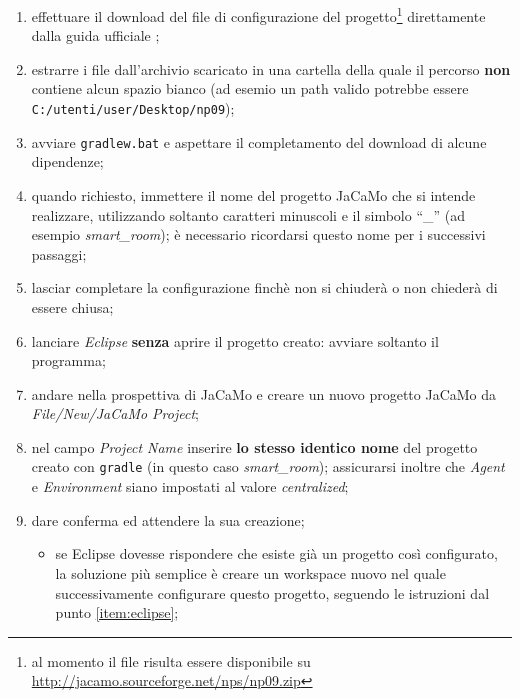 \documentclass[12pt,a4paper,openright,oneside]{report}
\newcommand{\quotes}[1]{``#1''}
\begin{document}
\begin{enumerate}
	\item effettuare il download del file di configurazione del progetto\footnote{al momento il file risulta essere disponibile su \url{http://jacamo.sourceforge.net/nps/np09.zip}} direttamente dalla guida ufficiale \cite{jacamo};
	
	\item estrarre i file dall'archivio scaricato in una cartella della quale il percorso \textbf{non} contiene alcun spazio bianco (ad esemio un path valido potrebbe essere \texttt{C:/utenti/user/Desktop/np09});
	
	\item avviare \texttt{gradlew.bat} e aspettare il completamento del download di alcune dipendenze;
	
	\item quando richiesto, immettere il nome del progetto JaCaMo che si intende realizzare, utilizzando soltanto caratteri minuscoli e il simbolo \quotes{\_} (ad esempio \textit{smart\_room}); è necessario ricordarsi questo nome per i successivi passaggi;
	
	\item lasciar completare la configurazione finchè non si chiuderà o non chiederà di essere chiusa;
	
	\item \label{item:eclipse}lanciare \textit{Eclipse} \textbf{senza} aprire il progetto creato: avviare soltanto il programma;
	
	\item andare nella prospettiva di JaCaMo e creare un nuovo progetto JaCaMo da \textit{File/New/JaCaMo Project};
	
	\item nel campo \textit{Project Name} inserire \textbf{lo stesso identico nome} del progetto creato con \texttt{gradle} (in questo caso \textit{smart\_room}); assicurarsi inoltre che \textit{Agent} e \textit{Environment} siano impostati al valore \textit{centralized};
	
	\item dare conferma ed attendere la sua creazione;
	\begin{itemize}
		\item se Eclipse dovesse rispondere che esiste già un progetto così configurato, la soluzione più semplice è creare un workspace nuovo nel quale successivamente configurare questo progetto, seguendo le istruzioni dal punto \ref{item:eclipse};
	\end{itemize}
	

\end{enumerate}
\end{document}
